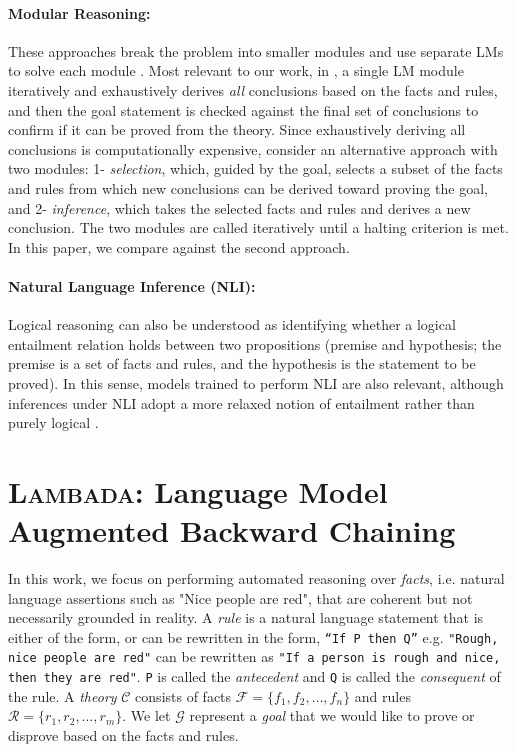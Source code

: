 \documentclass[11pt]{article}
\newcommand{\theory}[1]{\ensuremath{\mathcal{#1}}}
\newcommand{\facts}[1]{\ensuremath{\mathcal{#1}}}
\newcommand{\rules}[1]{\ensuremath{\mathcal{#1}}}
\newcommand{\goal}[1]{\ensuremath{\mathcal{#1}}}
\newcommand{\algo}{\textsc{Lambada}}
\begin{document}
\paragraph{Modular Reasoning:} These approaches break the problem into smaller modules and use separate LMs to solve each module \cite{zhou2022teaching,khot2022decomposed,sprague2022natural,zhou2022least}. 
Most relevant to our work,
in \cite{tafjord2020proofwriter}, a single LM module iteratively and exhaustively derives \emph{all} conclusions based on the facts and rules, and then the goal statement is checked against the final set of conclusions to confirm if it can be proved from the theory. Since exhaustively deriving all conclusions is computationally expensive, \citet{creswell2022selection} consider an alternative approach with two modules: 1- \emph{selection}, which, guided by the goal, selects a subset of the facts and rules from which new conclusions can be derived toward proving the goal, and 2- \emph{inference}, which takes the selected facts and rules and derives a new conclusion. The two modules are called iteratively until a halting criterion is met. In this paper, we compare against the second approach. 

\paragraph{Natural Language Inference (NLI):} Logical reasoning can also be understood as identifying whether a logical entailment relation holds between two propositions (premise and hypothesis; the premise is a set of facts and rules, and the hypothesis is the statement to be proved). In this sense, models trained to perform NLI are also relevant, although inferences under NLI adopt a more relaxed notion of entailment rather than purely logical \cite{dagan2013recognizing,bowman2015large,N18-1101}.

\section{\algo: Language Model Augmented Backward Chaining} \label{sec:method}
In this work, we focus on performing automated reasoning over \emph{facts}, i.e. natural language  assertions such as "Nice people are red", that are coherent but not necessarily grounded in reality. A \emph{rule} is a natural language statement that is either of the form, or can be rewritten in the form, \texttt{``If P then Q''} e.g. \texttt{"Rough, nice people are red"} can be rewritten as  \texttt{"If a person is rough and nice, then they are red"}. \texttt{P} is called the \emph{antecedent} and \texttt{Q} is called the \emph{consequent} of the rule. A \emph{theory} \theory{C} consists of facts $\facts{F}=\{f_1, f_2, \dots, f_n\}$ and rules $\rules{R}=\{r_1, r_2, \dots, r_m\}$. We let \goal{G} represent a \emph{goal} that we would like to prove or disprove based on the facts and rules. 
\end{document}
